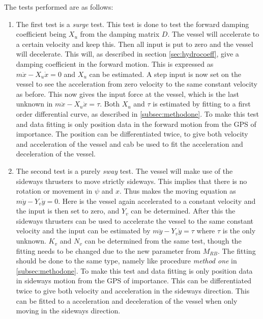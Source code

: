 The tests performed are as follows:
\begin{enumerate}
	\item The first test is a \textit{surge} test. This test is done to test the forward damping coefficient being $X_u$ from the damping matrix $D$. The vessel will accelerate to a certain velocity and keep this. Then all input is put to zero and the vessel will decelerate. This will, as described in section \ref{sec:hydrocoeff}, give a damping coefficient in the forward motion. This is expressed as $m \ddot x - X_u \dot x = 0$ and $X_u$ can be estimated. A step input is now set on the vessel to see the acceleration from zero velocity to the same constant velocity as before. This now gives the input force at the vessel, which is the last unknown in $m \ddot x - X_u \dot x = \tau$. Both $X_u$ and $\tau$ is estimated by fitting to a first order differential curve, as described in \ref{subsec:methodone}. To make this test and data fitting is only position data in the forward motion from the \ac{GPS} of importance. The position can be differentiated twice, to give both velocity and acceleration of the vessel and cab be used to fit the acceleration and deceleration of the vessel.
	\item The second test is a purely \textit{sway} test. The vessel will make use of the sideways thrusters to move strictly sideways. This implies that there is no rotation or movement in $\psi$ and $x$. Thus makes the moving equation as $m \ddot y - Y_v \dot y = 0$. Here is the vessel again accelerated to a constant velocity and the input is then set to zero, and $Y_v$ can be determined. After this the sideways thrusters can be used to accelerate the vessel to the same constant velocity and the input can be estimated by $m \ddot y - Y_v \dot y = \tau$ where $\tau$ is the only unknown. $K_v$ and $N_v$ can be determined from the same test, though the fitting needs to be changed due to the new parameter from $M_{RB}$. The fitting should be done to the same type, namely like procedure \textit{method one} in \ref{subsec:methodone}. To make this test and data fitting is only position data in sideways motion from the \ac{GPS} of importance. This can be differentiated twice to give both velocity and acceleration in the sideways direction. This can be fitted to a acceleration and deceleration of the vessel when only moving in the sideways direction.

\end{enumerate}
